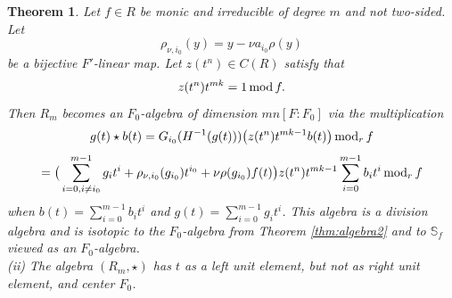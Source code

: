 \documentclass[12pt]{amsart}
\theoremstyle{plain}
\newtheorem{theorem}{Theorem}[section]
\theoremstyle{definition}
\numberwithin{equation}{section}
\numberwithin{figure}{section}
\begin{document}
\begin{theorem} \label{thm:algebra3}
Let $f\in R$ be monic and irreducible of degree $m$ and not two-sided. Let
$$\rho_{\nu,i_0}(y)=y-\nu a_{i_0}\rho(y)$$
 be a bijective $F'$-linear map.
 Let $z(t^n)\in C(R)$ satisfy that
 $$z(t^n)t^{mk}=1\,{\rm mod}\,f.$$
 Then $R_m$ becomes an $F_0$-algebra  of dimension $mn[F:F_0]$  via the multiplication
$$g(t) \star b(t)=G_{i_0}(H^{-1}(g(t))) \big( z(t^n)t^{mk-1} b(t)\big) \, {\rm mod}_r\, f$$
$$=\big(\sum_{i=0,i\not=i_0}^{m-1} g_it^i +\rho_{\nu,i_0}(g_{i_0})t^{i_0} + \nu\rho(g_{i_0})f(t)\big) z(t^n)t^{mk-1} \sum_{i=0}^{m-1} b_it^i \, {\rm mod}_r\,f$$
when $b(t)=\sum_{i=0}^{m-1} b_it^i$ and $g(t)=\sum_{i=0}^{m-1} g_it^i$.
This algebra is a division algebra and is isotopic to the $F_0$-algebra from Theorem  \ref{thm:algebra2} and to $\mathbb{S}_f$ viewed as an $F_0$-algebra.
\\ (ii) The algebra $(R_m,\star)$  has $t$ as a left unit element, but not as right unit element, and center $F_0$.
\end{theorem}
\end{document}
